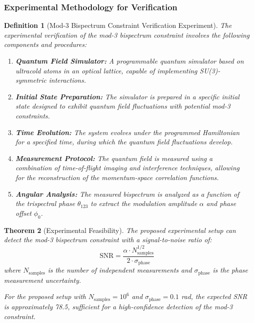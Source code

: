\documentclass[11pt,a4paper]{article}
\newtheorem{theorem}{Theorem}[section]
\newtheorem{definition}[theorem]{Definition}
\begin{document}
\subsubsection{Experimental Methodology for Verification}
\label{ssubsec:bispectrum_experiment}

\begin{definition}[Mod-3 Bispectrum Constraint Verification Experiment]
\label{def:mod3_experiment}
The experimental verification of the mod-3 bispectrum constraint involves the following components and procedures:

\begin{enumerate}
    \item \textbf{Quantum Field Simulator:} A programmable quantum simulator based on ultracold atoms in an optical lattice, capable of implementing SU(3)-symmetric interactions.
    
    \item \textbf{Initial State Preparation:} The simulator is prepared in a specific initial state designed to exhibit quantum field fluctuations with potential mod-3 constraints.
    
    \item \textbf{Time Evolution:} The system evolves under the programmed Hamiltonian for a specified time, during which the quantum field fluctuations develop.
    
    \item \textbf{Measurement Protocol:} The quantum field is measured using a combination of time-of-flight imaging and interference techniques, allowing for the reconstruction of the momentum-space correlation functions.
    
    \item \textbf{Angular Analysis:} The measured bispectrum is analyzed as a function of the trispectral phase $\theta_{123}$ to extract the modulation amplitude $\alpha$ and phase offset $\phi_0$.
\end{enumerate}
\end{definition}

\begin{theorem}[Experimental Feasibility]
\label{thm:mod3_feasibility}
The proposed experimental setup can detect the mod-3 bispectrum constraint with a signal-to-noise ratio of:
\begin{equation}
\text{SNR} = \frac{\alpha \cdot N_{\text{samples}}^{1/2}}{2 \cdot \sigma_{\text{phase}}}
\end{equation}
where $N_{\text{samples}}$ is the number of independent measurements and $\sigma_{\text{phase}}$ is the phase measurement uncertainty.

For the proposed setup with $N_{\text{samples}} = 10^6$ and $\sigma_{\text{phase}} = 0.1$ rad, the expected SNR is approximately 78.5, sufficient for a high-confidence detection of the mod-3 constraint.
\end{theorem}
\end{document}
